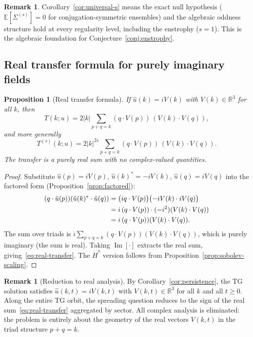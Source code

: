 \documentclass[11pt]{article}
\newtheorem{proposition}[theorem]{Proposition}
\theoremstyle{definition}
\newtheorem{remark}[theorem]{Remark}
\newcommand{\R}{\mathbb{R}}
\newcommand{\E}{\mathbb{E}}
\newcommand{\Hdot}[1]{\dot{H}^{#1}}
\DeclareMathOperator{\im}{Im}
\begin{document}
\begin{remark}
Corollary~\ref{cor:universal-s} means the exact
null hypothesis ($\E[\Sigma^{(s)}]=0$ for
conjugation-symmetric ensembles) and the algebraic
oddness structure hold at every regularity level,
including the enstrophy ($s=1$).  This is the
algebraic foundation for
Conjecture~\ref{conj:enstrophy}.
\end{remark}

\subsection{Real transfer formula for purely imaginary fields}

\begin{proposition}[Real transfer formula]
\label{prop:real-transfer}
If $\hat u(k) = iV(k)$ with $V(k)\in\R^3$ for all $k$,
then
\begin{equation}\label{eq:real-transfer}
T(k;u) = 2|k|\sum_{p+q=k}
(q\cdot V(p))\,(V(k)\cdot V(q)),
\end{equation}
and more generally
\begin{equation}\label{eq:real-transfer-s}
T^{(s)}(k;u) = 2|k|^{2s}\sum_{p+q=k}
(q\cdot V(p))\,(V(k)\cdot V(q)).
\end{equation}
The transfer is a purely real sum with no
complex-valued quantities.
\end{proposition}

\begin{proof}
Substitute $\hat u(p)=iV(p)$,
$\hat u(k)^*=-iV(k)$, $\hat u(q)=iV(q)$
into the factored form
(Proposition~\ref{prop:factored}):
\begin{align}
(q\cdot\hat u(p))(\hat u(k)^*\cdot\hat u(q))
&= \bigl(iq\cdot V(p)\bigr)
  \bigl(-iV(k)\cdot iV(q)\bigr) \notag\\
&= i\,(q\cdot V(p))\cdot(-i^2)(V(k)\cdot V(q))
\notag\\
&= i\,(q\cdot V(p))(V(k)\cdot V(q)).
\end{align}
The sum over triads is
$i\sum_{p+q=k}(q\cdot V(p))(V(k)\cdot V(q))$,
which is purely imaginary (the sum is real).
Taking $\im[\cdot]$ extracts the real sum,
giving~\eqref{eq:real-transfer}.
The $\Hdot{s}$ version follows from
Proposition~\ref{prop:sobolev-scaling}.
\end{proof}

\begin{remark}[Reduction to real analysis]
\label{rem:real-analysis}
By Corollary~\ref{cor:persistence}, the TG
solution satisfies $\hat u(k,t)=iV(k,t)$ with
$V(k,t)\in\R^3$ for all $k$ and all $t\geq 0$.
Along the entire TG orbit, the spreading question
reduces to the sign of the real
sum~\eqref{eq:real-transfer}
aggregated by sector.  All complex analysis is
eliminated: the problem is entirely about the
geometry of the real vectors $V(k,t)$ in the
triad structure $p+q=k$.
\end{remark}
\end{document}
